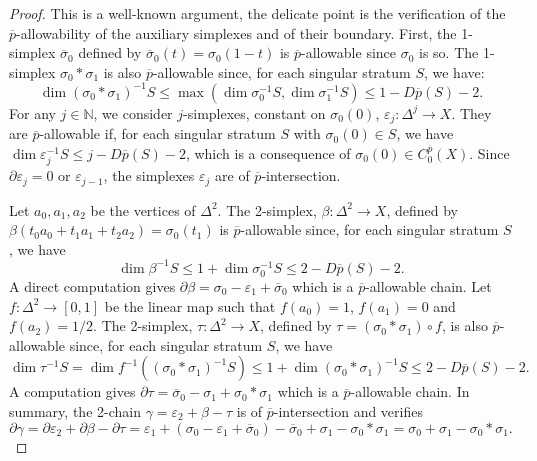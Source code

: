 \documentclass[a4paper,10pt,english,reqno]{amsart}
\theoremstyle{plain}
\theoremstyle{definition}
\theoremstyle{remark}
\numberwithin{equation}{section}
\def\ov{\overline}
\def\N{\mathbb{N}}
\def\eps{\varepsilon}
\renewcommand\1{\hbox{\ding{192}}}
\renewcommand\2{\hbox{\ding{193}}}
\newcommand\3{\hbox{\ding{194}}}
\newcommand\4{\hbox{\ding{195}}}
\begin{document}
\begin{proof}
This is a well-known argument, the  delicate point is the verification of the $\ov{p}$-allowability of the auxiliary simplexes and of their boundary.
First, the 1-simplex $\ov \sigma_0$ defined by $\ov \sigma_0(t) = \sigma_0(1-t)$ is $\ov p$-allowable since $\sigma_{0}$ is so.
The 1-simplex $\sigma_{0}*\sigma_{1}$ is also $\ov{p}$-allowable since,  for each singular stratum $S$, we have:
      $$
      \dim (\sigma_0*\sigma_1)^{-1}S \leq \max ( \dim \sigma_0^{-1}S, \dim  \sigma_1^{-1}S) \leq 1 - D\ov p(S) -2.
      $$
For any $j\in \N$, we consider $j$-simplexes, constant on $\sigma_{0}(0)$,  $\eps_j \colon \Delta^j \to X$.
They are $\ov p$-allowable if, for each singular stratum $S$ with $\sigma_0(0) \in S$,  we have
$ \dim \eps_j  ^{-1}S \leq j - D\ov p(S) -2$, which is a consequence of
% 
 $\sigma_0(0) \in C_0^{\ov p}(X)$. 
 Since $\partial \eps_j = 0$ or  $\eps_{j-1}$, the simplexes $\eps_j$ are of $\ov p$-intersection.

   
 Let $a_{0},a_{1},a_{2}$ be the vertices of $\Delta^2$. The 2-simplex, $\beta\colon \Delta^2\to X$, defined by
 $\beta(t_{0}a_{0}+t_{1}a_{1}+t_{2}a_{2})=\sigma_{0}(t_{1})$ is $\ov{p}$-allowable since,
% 
for each singular stratum $S$, we have
$$
\dim \beta^{-1}S \leq 1+\dim \sigma_0^{-1} S
\leq
2 - D\ov p(S) -2 .
$$
A direct computation gives
$\partial \beta =  \sigma_0  - \eps_1 + \ov \sigma_0$  which is a $\ov p$-allowable chain. 
%
Let $f\colon \Delta^2\to [0,1]$ be the linear map such that $f(a_{0})=1$, $f(a_{1})=0$ and $f(a_{2})=1/2$.
The 2-simplex, $\tau\colon \Delta^2\to X$, defined by $\tau=(\sigma_{0}\ast\sigma_{1})\circ f$, is also $\ov{p}$-allowable since,
%
for each singular stratum $S$, we have
$$
\dim \tau^{-1}S =\dim f^{-1}\left( (\sigma_0*\sigma_1)^{-1} S\right) \leq 1+ \dim (\sigma_0*\sigma_1)^{-1} S \leq 2 - D\ov p(S) -2.
$$
%
A computation gives $\partial \tau = \ov \sigma_0  -  \sigma_1 +  \sigma_0 * \sigma_1$
which is a $\ov{p}$-allowable chain.
%
In summary, the  2-chain $\gamma =  \eps_2 + \beta - \tau $ is of $\ov p$-intersection and verifies
%
$$\partial \gamma =\partial \eps_2 + \partial \beta -  \partial \tau = \eps_1 +(   \sigma_0  - \eps_1 + \ov \sigma_0) 
-  \ov \sigma_0  +  \sigma_1 - \sigma_0 * \sigma_1 =  
  \sigma_0
  + \sigma_1 -  \sigma_0 * \sigma_1.$$
%
\end{proof}
\end{document}
